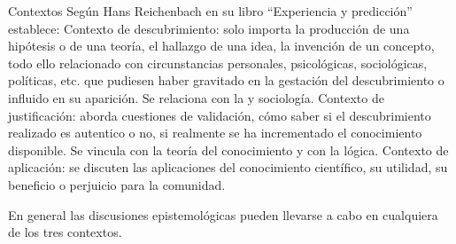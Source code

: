 \documentclass{article}
\begin{document}
Contextos
Según Hans Reichenbach en su libro “Experiencia y predicción” establece:
Contexto de descubrimiento: solo importa la producción de una hipótesis o de una teoría, el hallazgo de una idea, la invención de un concepto, todo ello relacionado con circunstancias personales, psicológicas, sociológicas, políticas, etc. que pudiesen haber gravitado en la gestación del descubrimiento o influido en su aparición. Se relaciona con la y sociología.
Contexto de justificación: aborda cuestiones de validación, cómo saber si el descubrimiento realizado es autentico o no, si realmente se ha incrementado el conocimiento disponible. Se vincula con la teoría del conocimiento y con la lógica.
Contexto de aplicación: se discuten las aplicaciones del conocimiento científico, su utilidad, su beneficio o perjuicio para la comunidad.

En general las discusiones epistemológicas pueden llevarse a cabo en cualquiera de los tres contextos.
\end{document}
